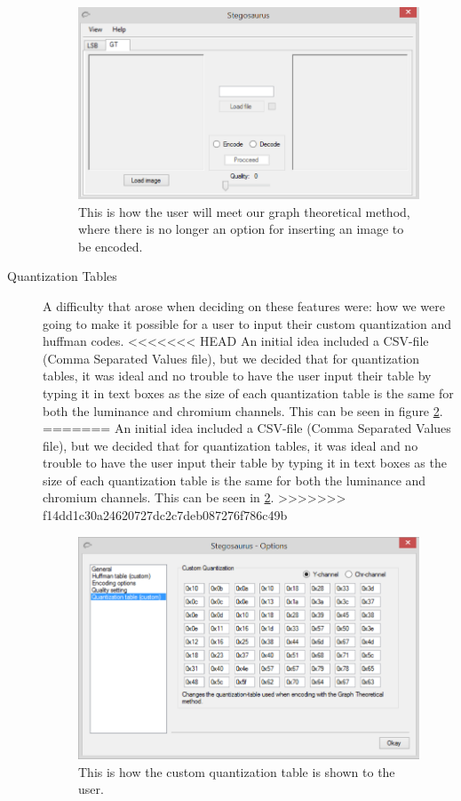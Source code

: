 \begin{description}
\begin{figure}
	\centering
	\includegraphics[width=1\textwidth]{figures/StegoGTAMain.png}
	\caption{This is how the user will meet our graph theoretical method, where there is no longer an option for inserting an image to be encoded.}
	\label{fig:StegoGTAMain2}
\end{figure}

\item[Quantization Tables]
A difficulty that arose when deciding on these features were: how we were going to make it possible for a user to input their custom quantization and huffman codes.
<<<<<<< HEAD
An initial idea included a CSV-file (Comma Separated Values file), but we decided that for quantization tables, it was ideal and no trouble to have the user input their table by typing it in text boxes as the size of each quantization table is the same for both the luminance and chromium channels. This can be seen in figure \ref{fig:StegoOptionQuant}.
=======
An initial idea included a CSV-file (Comma Separated Values file), but we decided that for quantization tables, it was ideal and no trouble to have the user input their table by typing it in text boxes as the size of each quantization table is the same for both the luminance and chromium channels.
This can be seen in \ref{fig:StegoOptionQuant}.
>>>>>>> f14dd1c30a24620727dc2c7deb087276f786c49b

\begin{figure}
	\centering
	\includegraphics[width=1\textwidth]{figures/StegoOptionQuant.png}
	\caption{This is how the custom quantization table is shown to the user.}
	\label{fig:StegoOptionQuant}
\end{figure}


\end{description}
